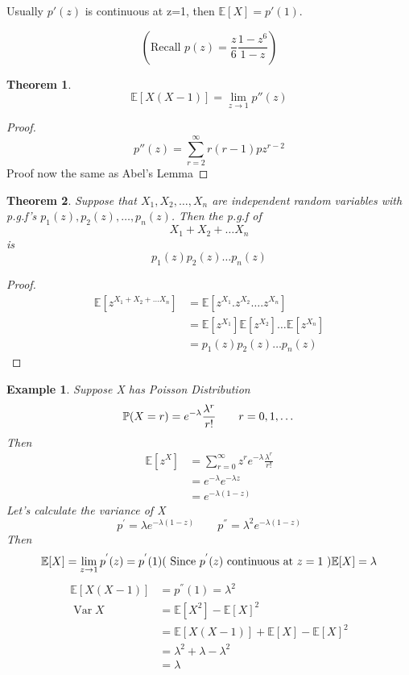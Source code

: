 \documentclass{notes}
\theoremstyle{plain}
\newtheorem{theorem}{Theorem}[chapter]
\newtheorem*{example}{Example}
\newcommand{\bP}{\mathbb{P}}
\newcommand{\bE}{\mathbb{E}}
\newcommand{\prob}[1]{\bP \negthinspace\left(#1\right)}
\newcommand{\expect}[1]{\bE\!\left[#1\right]}
\DeclareMathOperator{\var}{Var}
\begin{document}
Usually $ p'(z)$ is continuous at z=1, then $\expect{X}
=p'(1)$.

\[
\left(\text{Recall } p(z) = \frac{z}{6}\frac{1-z^6}{1-z} \right)
\] 

\begin{theorem}

\[
\expect{X(X-1)} = \lim_{z\to1} p''(z)
\]

\end{theorem}

\begin{proof}
\[
p''(z) = \sum_{r=2}^\infty r(r-1)p z^{r-2}
\]
Proof now the same as Abel's Lemma
\end{proof}

\begin{theorem}
  Suppose that $X_1, X_2,\dots ,X_n$ are independent random variables
  with p.g.f's $p_1(z),p_2(z),\dots,p_n(z)$.  Then the p.g.f of
\[
X_1+X_2+\dots X_n
\]
is
\[
p_1(z)p_2(z)\dots p_n(z)
\]
\end{theorem}
\begin{proof}
\begin{align*}
\expect{z^{X_1+X_2 +\dots X_n}} 
&= \expect{z^{X_1}.z^{X_2}\dots .z^{X_n}}\\
&= \expect{z^{X_1}}\expect{z^{X_2}}\dots\expect{z^{X_n}}\\
&=p_1(z)p_2(z)\dots p_n(z)
\end{align*}
\end{proof}
\begin{example}
Suppose X has Poisson Distribution
\[
\prob{X=r} = e^{-\lambda}\frac{\lambda^r}{r!} \qquad r=0,1,\dots
\]
Then
\begin{align*}
\expect{z^X} &= \sum_{r=0}^\infty z^r e^{-\lambda} \frac{\lambda^r}{r!}\\
&=  e^{-\lambda}e^{-\lambda z}\\
&= e^{-\lambda(1-z)}
\end{align*}
Let's calculate the variance of X
\[
p^{'}= \lambda e^{-\lambda(1-z)} \qquad p^{''}= \lambda^2 e^{-\lambda(1-z)}
\]
Then
\[
\expect{X}= \lim_{z\to1} p^{'}(z) = p^{'}(1) (\text{ Since $p^{'}(z)$ 
continuous at $z=1$ }) \newline
\expect{X} = \lambda
\]
\begin{align*}
\expect{X(X-1)} &= p^{''}(1) = \lambda^2\\
\var X &= \expect{X^2}- \expect{X}^2\\
&= \expect{X(X-1)} + \expect{X} -\expect{X}^2\\
&=\lambda^2 + \lambda - \lambda^2\\
&=\lambda
\end{align*}
\end{example}
\end{document}
